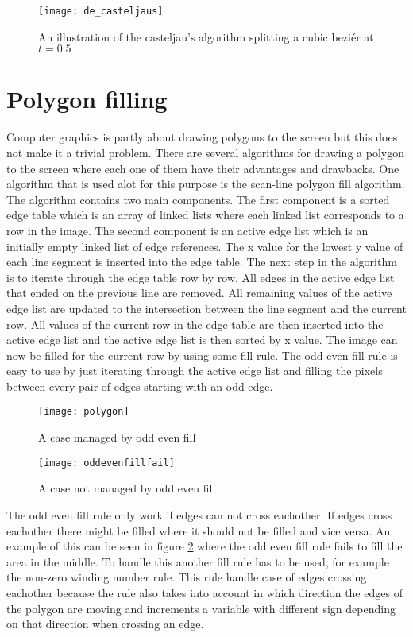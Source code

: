\begin{figure}[H]
\texttt{[image: de\_casteljaus]}
\caption{An illustration of the casteljau's algorithm splitting a cubic beziér at $t=0.5$}
\label{fig:decasteljaus}
\end{figure}

\section{Polygon filling}
Computer graphics is partly about drawing polygons to the screen but this does not make it a trivial problem. There are several algorithms for drawing a polygon to the screen where each one of them have their advantages and drawbacks. One algorithm that is used alot for this purpose is the scan-line polygon fill algorithm. The algorithm contains two main components. The first component is a sorted edge table which is an array of linked lists where each linked list corresponds to a row in the image. The second component is an active edge list which is an initially empty linked list of edge references. The x value for the lowest y value of each line segment is inserted into the edge table. The next step in the algorithm is to iterate through the edge table row by row. All edges in the active edge list that ended on the previous line are removed. All remaining values of the active edge list are updated to the intersection between the line segment and the current row. All values of the current row in the edge table are then inserted into the active edge list and the active edge list is then sorted by x value. The image can now be filled for the current row by using some fill rule. The odd even fill rule is easy to use by just iterating through the active edge list and filling the pixels between every pair of edges starting with an odd edge.

\begin{figure}[H]
  \texttt{[image: polygon]}
  \caption{A case managed by odd even fill}\label{fig:awesome_image1}
\endminipage\hfill
{}
  \texttt{[image: oddevenfillfail]}
  \caption{A case not managed by odd even fill}\label{fig:awesome_image2}
	\label{fig:poly}
\endminipage\hfill
\end{figure}

The odd even fill rule only work if edges can not cross eachother. If edges cross eachother there might be filled where it should not be filled and vice versa. An example of this can be seen in figure \ref{fig:poly} where the odd even fill rule fails to fill the area in the middle. To handle this another fill rule has to be used, for example the non-zero winding number rule. This rule handle case of edges crossing eachother because the rule also takes into account in which direction the edges of the polygon are moving and increments a variable with different sign depending on that direction when crossing an edge.
